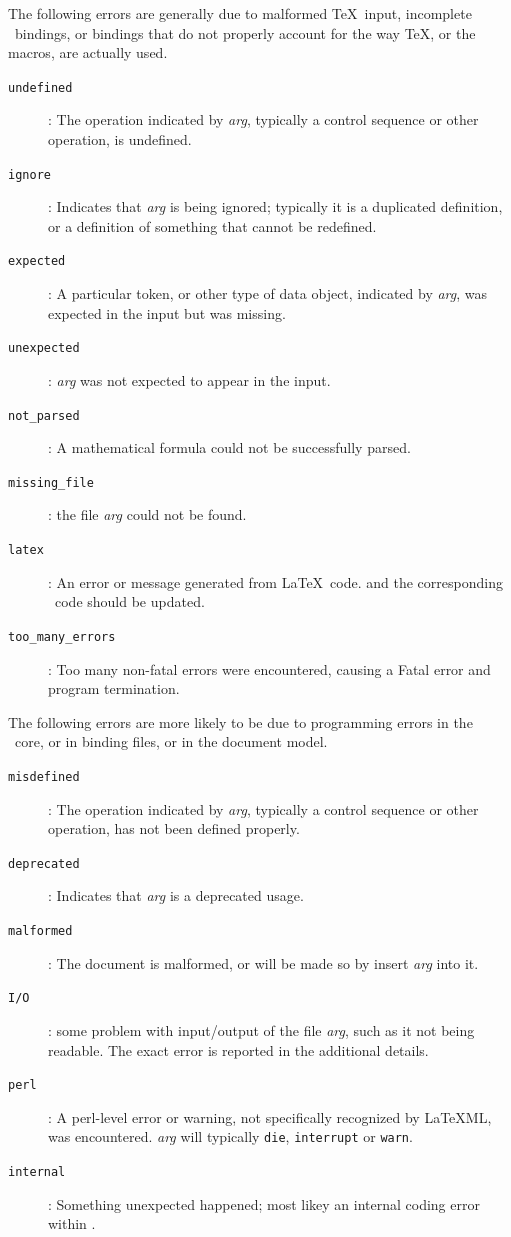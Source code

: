 \documentclass{book}
\begin{document}
The following errors are generally due to malformed \TeX\ input, 
incomplete \LaTeXML\ bindings, or bindings that
do not properly account for the way \TeX, or the macros, are actually used.
\begin{description}
\item[\texttt{undefined}]: The operation indicated by \textit{arg},
  typically a control sequence or other operation, is undefined.
\item[\texttt{ignore}]: Indicates that \textit{arg} is being ignored;
 typically it is a duplicated definition, or a definition of something that cannot be redefined.
\item[\texttt{expected}]: A particular token, or other type of data object,
   indicated by \textit{arg}, was expected in the input but was missing.
\item[\texttt{unexpected}]: \textit{arg} was not expected to appear in the input.
\item[\texttt{not\_parsed}]: A mathematical formula could not be successfully parsed.
\item[\texttt{missing\_file}]: the file \textit{arg} could not be found.
\item[\texttt{latex}]: An error or message generated from \LaTeX\ code.
  and the corresponding \LaTeXML\ code should be updated.
\item[\texttt{too\_many\_errors}]: Too many non-fatal errors were encountered,
  causing a Fatal error and program termination.
\end{description}

The following errors are more likely to be due to programming errors in the
\LaTeXML\ core, or in binding files, or in the document model.
\begin{description}
\item[\texttt{misdefined}]: The operation indicated by \textit{arg},
   typically a control sequence or other operation,
   has not been defined properly.
\item[\texttt{deprecated}]: Indicates that \textit{arg} is a deprecated usage.
\item[\texttt{malformed}]: The document is malformed, or will be made so
  by insert \textit{arg} into it.
\item[\texttt{I/O}]: some problem with input/output of the file \textit{arg},
  such as it not being readable. The exact error is reported in the additional details.
\item[\texttt{perl}]: A perl-level error or warning, not specifically recognized
  by LaTeXML, was encountered.
  \textit{arg} will typically \texttt{die}, \texttt{interrupt} or \texttt{warn}.
\item[\texttt{internal}]: Something unexpected happened; most likey an
  internal coding error within \LaTeXML.
\end{description}
\end{document}
